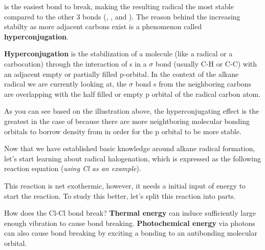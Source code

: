 \documentclass[10pt]{article}
\begin{document}

   is the easiest bond to break, making the resulting radical the most stable compared to the other 3 bonds (, , and ). The reason behind the increasing stabilty as more adjacent carbons exist is a phenomenon called \textbf{hyperconjugation}.

  \textbf{Hyperconjugation} is the stabilization of a molecule (like a radical or a carbocation) through the interaction of s in a $\sigma$ bond (usually C-H or C-C) with an adjacent empty or partially filled p-orbital. In the context of the alkane radical we are currently looking at, the $\sigma$ bond s from the neighboring carbons are overlapping with the half filled or empty p orbital of the radical carbon atom. 


  As you can see based on the illustration above, the hyperconjugating effect is the greatest in the case of  because there are more neightboring molecular bonding orbitals to borrow  density from in order for the p orbital to be more stable.

  Now that we have established basic knowledge around alkane radical formation, let's start learning about radical halogenation, which is expressed as the following reaction equation (\textit{using Cl as an example}).


  This reaction is net exothermic, however, it needs a initial input of energy to start the reaction. To study this better, let's split this reaction into parts.


  How does the Cl-Cl bond break? \textbf{Thermal energy} can induce sufficiently large enough vibration to cause bond breaking. \textbf{Photochemical energy} via photons can also cause bond breaking by exciting a bonding  to an antibonding molecular orbital.

\end{document}
